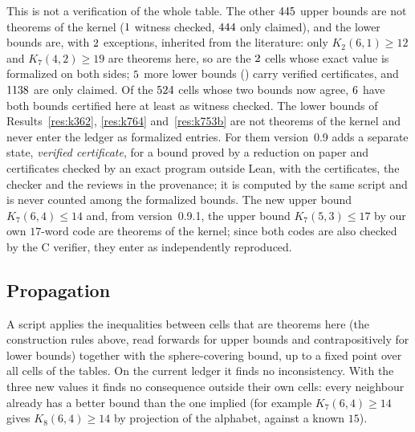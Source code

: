 \documentclass[11pt]{amsart}
\theoremstyle{definition}
\theoremstyle{remark}
\begin{document}
This is not a verification of the whole table.
The other $445$ upper bounds are not theorems of the kernel ($1$ witness checked, $444$ only claimed), and the lower bounds are, with $2$ exceptions, inherited from the literature: only $K_2(6,1)\ge 12$ and $K_7(4,2)\ge 19$ are theorems here, so \ExatasLeanLista{} are the $2$ cells whose exact value is formalized on both sides; $5$ more lower bounds (\LBVerificadaLista) carry verified certificates, and $1138$ are only claimed.
Of the $524$ cells whose two bounds now agree, $6$ have both bounds certified here at least as witness checked.
The lower bounds of Results~\ref{res:k362}, \ref{res:k764} and~\ref{res:k753b} are not theorems of the kernel and never enter the ledger as formalized entries.
For them version~0.9 adds a separate state, \emph{verified certificate}, for a bound proved by a reduction on paper and certificates checked by an exact program outside Lean, with the certificates, the checker and the reviews in the provenance; it is computed by the same script and is never counted among the formalized bounds.
The new upper bound $K_7(6,4)\le 14$ and, from version~0.9.1, the upper bound $K_7(5,3)\le 17$ by our own $17$-word code are theorems of the kernel; since both codes are also checked by the C verifier, they enter as independently reproduced.

\subsection*{Propagation}
A script applies the inequalities between cells that are theorems here (the construction rules above, read forwards for upper bounds and contrapositively for lower bounds) together with the sphere-covering bound, up to a fixed point over all cells of the tables.
On the current ledger it finds no inconsistency.
With the three new values it finds no consequence outside their own cells: every neighbour already has a better bound than the one implied (for example $K_7(6,4)\ge 14$ gives $K_8(6,4)\ge 14$ by projection of the alphabet, against a known $15$).
\end{document}
